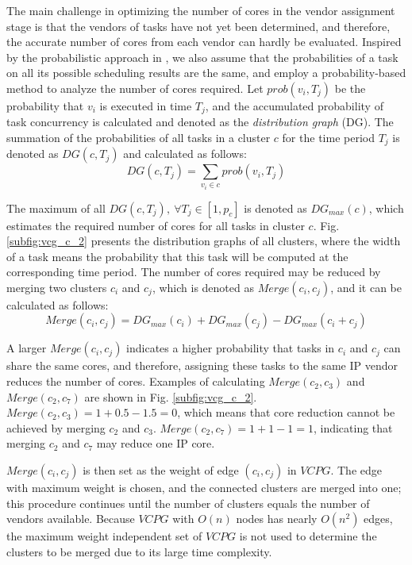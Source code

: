 \documentclass[10pt,journal, compsoc]{IEEEtran}
\begin{document}
The main challenge in optimizing the number of cores in the vendor assignment stage is that the vendors of tasks have not yet been determined, and therefore, the accurate number of cores from each vendor can hardly be evaluated. Inspired by the probabilistic approach in \cite{article:PP}, we also assume that the probabilities of a task on all its possible scheduling results are the same, and employ a probability-based method to analyze the number of cores required. Let $prob(v_i,T_j)$ be the probability that $v_i$ is executed in time $T_j$, and the accumulated probability of task concurrency is calculated and denoted as the \textit{distribution graph} (DG). The summation of the probabilities of all tasks in a cluster $c$ for the time period $T_j$ is denoted as $DG(c, T_j)$ and calculated as follows:
\begin{equation}
DG(c, T_j) = \sum \limits_{v_i\in c} prob(v_i, T_j)
\end{equation}



The maximum of all $DG(c, T_j), ~\forall T_j\in[1, p_c]$ is denoted as $DG_{max}(c)$, which estimates the required number of cores for all tasks in cluster $c$. Fig. \ref{subfig:vcg_c_2} presents the distribution graphs of all clusters, where the width of a task means the probability that this task will be computed at the corresponding time period. The number of cores required may be reduced by merging two clusters $c_i$ and $c_j$, which is denoted as $Merge(c_i, c_j)$, and it can be calculated as follows:
\begin{equation}
Merge(c_i, c_j) = DG_{max}(c_i) + DG_{max}(c_j) - DG_{max}(c_i+c_j)
\label{equ:weight_e2}
\end{equation}

A larger $Merge(c_i, c_j)$ indicates a higher probability that tasks in $c_i$ and $c_j$ can share the same cores, and therefore, assigning these tasks to the same IP vendor reduces the number of cores. Examples of calculating $Merge(c_2, c_3)$ and $Merge(c_2, c_7)$ are shown in Fig. \ref{subfig:vcg_c_2}. $Merge(c_2, c_3)=1+0.5-1.5=0$, which means that core reduction cannot be achieved by merging $c_2$ and $c_3$. $Merge(c_2, c_7)=1+1-1=1$, indicating that merging $c_2$ and $c_7$ may reduce one IP core.





$Merge(c_i, c_j)$ is then set as the weight of edge $(c_i, c_j)$ in $VCPG$. The edge with maximum weight is chosen, and the connected clusters are merged into one; this procedure continues until the number of clusters equals the number of vendors available. Because $VCPG$ with $O(n)$ nodes has nearly $O(n^2)$ edges, the maximum weight independent set of $VCPG$ is not used to determine the clusters to be merged due to its large time complexity.
\end{document}
